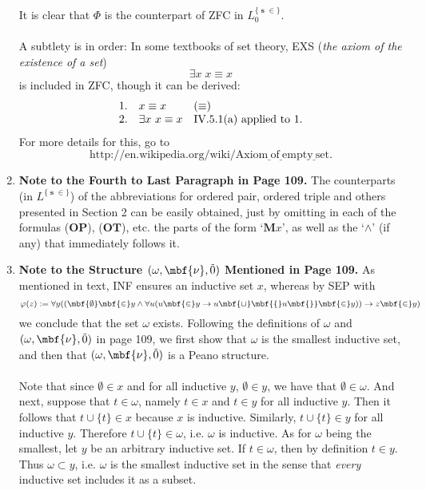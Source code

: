 \begin{enumerate}[1.]
\[\]
It is clear that $\Phi$ is the counterpart of ZFC in $L_0^{ \{ \mbfs{\in} \} }$.\\
\\
A subtlety is in order: In some textbooks of set theory, EXS (\emph{the axiom of the existence of a set})
\[
\exists x \; x \equiv x
\]
is included in ZFC, though it can be derived:
\[
\begin{array}{lll}
1. & x \equiv x & \mbox{$(\equiv)$} \cr
2. & \exists x \ x \equiv x & \mbox{IV.5.1(a) applied to 1.}
\end{array}
\]
For more details for this, go to
\[
\mbox{http://en.wikipedia.org/wiki/Axiom$\underline{\ }$of$\underline{\ }$empty$\underline{\ }$set}.
\]
%
\item \textbf{Note to the Fourth to Last Paragraph in Page 109.} The counterparts (in $L^{\{ \mbfs{\in} \}}$) of the abbreviations for ordered pair, ordered triple and others presented in Section 2 can be easily obtained, just by omitting in each of the formulas ($\mathbf{OP}$), ($\mathbf{OT}$), etc. the parts of the form `$\mathbf{M}x$', as well as the `$\land$' (if any) that immediately follows it.\\
%
\item \textbf{Note to the Structure $(\omega, \mbf{\nu}, \tilde{0})$ Mentioned in Page 109.} As mentioned in text, INF ensures an inductive set $x$, whereas by SEP with
\[
\varphi(z) := \forall y ((\mbf{\emptyset} \mbf{\in} y \land  \forall u (u \mbf{\in} y \rightarrow u \mbf{\cup} \mbf{\{ } u \mbf{ \}} \mbf{\in} y)) \rightarrow z \mbf{\in} y)
\]
we conclude that the set $\omega$ exists. Following the definitions of $\omega$ and $(\omega, \mbf{\nu}, \tilde{0})$ in page 109, we first show that $\omega$ is the smallest inductive set, and then that $(\omega, \mbf{\nu}, \tilde{0})$ is a Peano structure.\\
\\
Note that since $\emptyset \in x$ and for all inductive $y$, $\emptyset \in y$, we have that $\emptyset \in \omega$. And next, suppose that $t \in \omega$, namely $t \in x$ and $t \in y$ for all inductive $y$. Then it follows that $t \cup \{ t \} \in x$ because $x$ is inductive. Similarly, $t \cup \{ t \} \in y$ for all inductive $y$. Therefore $t \cup \{ t \} \in \omega$, i.e. $\omega$ is inductive. As for $\omega$ being the smallest, let $y$ be an arbitrary inductive set. If $t \in \omega$, then by definition $t \in y$. Thus $\omega \subset y$, i.e. $\omega$ is the smallest inductive set in the sense that \emph{every} inductive set includes it as a subset.\\

\end{enumerate}
